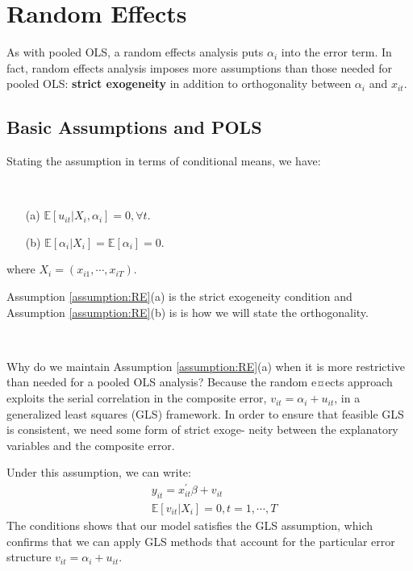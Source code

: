 \section{Random Effects}

As with pooled OLS, a random effects analysis puts $\alpha_i$ into the error term.
In fact, random effects analysis imposes more assumptions than those needed for pooled OLS:
\textbf{strict exogeneity} in addition to orthogonality between $\alpha_i$ and $x_{it}$. 

\subsection{Basic Assumptions and POLS}

Stating the assumption in terms of conditional means, we have:
\begin{assumption}\label{assumption:RE}
    \

    \begin{enumerate}
        \item[(a)] $\mathbb{E}[u_{it} | X_i, \alpha_i] = 0, \forall t.$
        \item[(b)] $\mathbb{E}[\alpha_i | X_i] = \mathbb{E}[\alpha_i] = 0.$
    \end{enumerate}
    where $X_i = (x_{i1}, \cdots, x_{iT})$.
\end{assumption}
Assumption \ref{assumption:RE}(a) is the strict exogeneity condition and Assumption \ref{assumption:RE}(b) is is how we will state the orthogonality.

\begin{remark}
    \

    Why do we maintain Assumption \ref{assumption:RE}(a) when it is more restrictive than needed for
    a pooled OLS analysis? Because the random e¤ects approach exploits the serial correlation in
    the composite error, $v_{it} = \alpha_i + u_{it}$, in a generalized least squares (GLS) framework. In
    order to ensure that feasible GLS is consistent, we need some form of strict exoge-
    neity between the explanatory variables and the composite error.

    Under this assumption, we can write:
    \begin{align*}
        & y_{it} = x_{it}^{\prime} \beta + v_{it} \\
        & \mathbb{E}[v_{it} | X_i] = 0, t=1, \cdots, T
    \end{align*}
    The conditions shows that our model satisfies the GLS assumption, which confirms that
    we can apply GLS methods that account for the particular error structure $v_{it} = \alpha_i + u_{it}.$
\end{remark}


